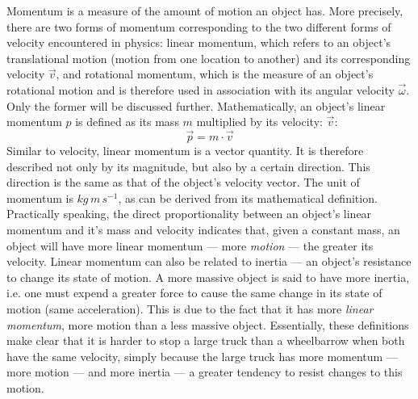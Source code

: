 Momentum is a measure of the amount of motion an object has. More precisely, there are two forms of momentum corresponding to the two different forms of velocity encountered in physics: linear momentum, which refers to an object's translational motion (motion from one location to another) and its corresponding velocity $\vec{v}$, and rotational momentum, which is the measure of an object's rotational motion and is therefore used in association with its angular velocity $\vec{\omega}$. Only the former will be discussed further. Mathematically, an object's linear momentum $p$ is defined as its mass $m$ multiplied by its velocity: $\vec{v}$: $$\vec{p} = m \cdot \vec{v}$$ Similar to velocity, linear momentum is a vector quantity. It is therefore described not only by its magnitude, but also by a certain direction. This direction is the same as that of the object's velocity vector. The unit of momentum is $kg \, m \, s^{-1}$, as can be derived from its mathematical definition. Practically speaking, the direct proportionality between an object's linear momentum and it's mass and velocity indicates that, given a constant mass, an object will have more linear momentum --- more \emph{motion} --- the greater its velocity. Linear momentum can also be related to inertia --- an object's resistance to change its state of motion. A more massive object is said to have more inertia, i.e. one must expend a greater force to cause the same change in its state of motion (same acceleration). This is due to the fact that it has more \emph{linear momentum}, more motion than a less massive object. Essentially, these definitions make clear that it is harder to stop a large truck than a wheelbarrow when both have the same velocity, simply because the large truck has more momentum --- more motion --- and more inertia --- a greater tendency to resist changes to this motion.



